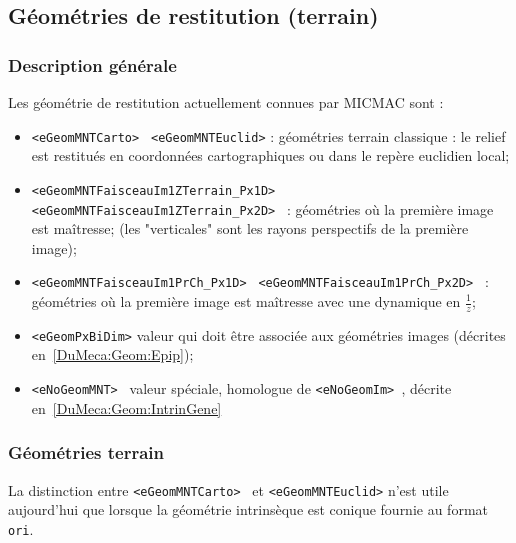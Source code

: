 
\subsection{G\'eom\'etries de restitution (terrain)}



\subsubsection{Description g\'en\'erale}
Les g\'eom\'etrie de restitution actuellement connues par MICMAC sont :

\begin{itemize}
   \item  {\tt <eGeomMNTCarto>  } {\tt  <eGeomMNTEuclid>} :
          g\'eom\'etries terrain classique :
          le relief est restitu\'es en coordonn\'ees cartographiques ou
          dans le rep\`ere euclidien local;


   \item {\tt    <eGeomMNTFaisceauIm1ZTerrain\_Px1D> }
         {\tt    <eGeomMNTFaisceauIm1ZTerrain\_Px2D> } :
         g\'eom\'etries o\`u la premi\`ere image est ma\^itresse; (les
         "verticales" sont les rayons perspectifs de la premi\`ere image);

   \item {\tt   <eGeomMNTFaisceauIm1PrCh\_Px1D> }
         {\tt   <eGeomMNTFaisceauIm1PrCh\_Px2D> } :
         g\'eom\'etries o\`u la premi\`ere image est ma\^itresse avec une
         dynamique en $\frac{1}{z}$;

   \item {\tt  <eGeomPxBiDim>} valeur qui doit \^etre associ\'ee aux 
          g\'eom\'etries images (d\'ecrites en~\ref{DuMeca:Geom:Epip});

   \item{\tt  <eNoGeomMNT> }  valeur sp\'eciale, homologue de
        {\tt   <eNoGeomIm> }, d\'ecrite en~\ref{DuMeca:Geom:IntrinGene}

\end{itemize}



\subsubsection{G\'eom\'etries terrain}

La distinction  entre {\tt <eGeomMNTCarto>  } et {\tt  <eGeomMNTEuclid>} 
n'est utile aujourd'hui que lorsque la g\'eom\'etrie intrins\`eque est conique
fournie au format {\tt ori}.

